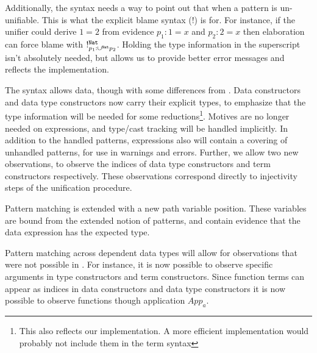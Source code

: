 Additionally, the syntax needs a way to point out that when a pattern is un-unifiable.
This is what the explicit blame syntax ($!$) is for.
For instance, if the unifier could derive $1=2$ from evidence $p_{1}:1=x$ and $p_{2}:2=x$ then elaboration can force blame with $!_{p_{1}:\cup^{\mathtt{Nat}{}}p_{2}}^{\mathtt{Nat}{}}$.
Holding the type information in the superscript isn't absolutely needed, but allows us to provide better error messages and reflects the implementation.
 
The syntax allows data, though with some differences from .
Data constructors and data type constructors now carry their explicit types, to emphasize that the type information will be needed for some reductions\footnote{
  This also reflects our implementation.
  A more efficient implementation would probably not include them in the term syntax}.
Motives are no longer needed on \case{} expressions, and type/cast tracking will be handled implicitly.
In addition to the handled patterns, \case{} expressions also will contain a covering of unhandled patterns, for use in warnings and errors.
Further, we allow two new observations, to observe the indices of data type constructors and term constructors respectively.
These observations correspond directly to injectivity steps of the unification procedure.
 
Pattern matching is extended with a new path variable position.
These variables are bound from the extended notion of patterns, and contain evidence that the data expression has the expected type.

Pattern matching across dependent data types will allow for observations that were not possible in .
For instance, it is now possible to observe specific arguments in type constructors and term constructors.
Since function terms can appear as indices in data constructors and data type constructors it is now possible to observe functions though application $App_{a}$.


